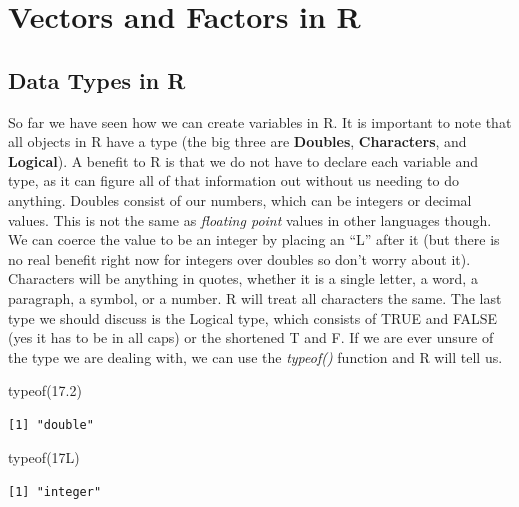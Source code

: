 \documentclass[
  letterpaper,
  DIV=11,
  numbers=noendperiod]{scrreprt}
\newenvironment{Shaded}{\begin{snugshade}}{\end{snugshade}}
\newcommand{\DecValTok}[1]{\textcolor[rgb]{0.68,0.00,0.00}{#1}}
\newcommand{\FloatTok}[1]{\textcolor[rgb]{0.68,0.00,0.00}{#1}}
\newcommand{\FunctionTok}[1]{\textcolor[rgb]{0.28,0.35,0.67}{#1}}
\newcommand{\NormalTok}[1]{\textcolor[rgb]{0.00,0.23,0.31}{#1}}
\begin{document}

\chapter{Vectors and Factors in R}\label{vectors-and-factors-in-r}

\section{Data Types in R}\label{data-types-in-r}

So far we have seen how we can create variables in R. It is important to
note that all objects in R have a type (the big three are
\textbf{Doubles}, \textbf{Characters}, and \textbf{Logical}). A benefit
to R is that we do not have to declare each variable and type, as it can
figure all of that information out without us needing to do anything.
Doubles consist of our numbers, which can be integers or decimal values.
This is not the same as \emph{floating point} values in other languages
though. We can coerce the value to be an integer by placing an ``L''
after it (but there is no real benefit right now for integers over
doubles so don't worry about it). Characters will be anything in quotes,
whether it is a single letter, a word, a paragraph, a symbol, or a
number. R will treat all characters the same. The last type we should
discuss is the Logical type, which consists of TRUE and FALSE (yes it
has to be in all caps) or the shortened T and F. If we are ever unsure
of the type we are dealing with, we can use the \emph{typeof()} function
and R will tell us.

\begin{Shaded}
\begin{Highlighting}[]
\FunctionTok{typeof}\NormalTok{(}\FloatTok{17.2}\NormalTok{)}
\end{Highlighting}
\end{Shaded}

\begin{verbatim}
[1] "double"
\end{verbatim}

\begin{Shaded}
\begin{Highlighting}[]
\FunctionTok{typeof}\NormalTok{(}\DecValTok{17}\NormalTok{L)}
\end{Highlighting}
\end{Shaded}

\begin{verbatim}
[1] "integer"
\end{verbatim}
\end{document}
